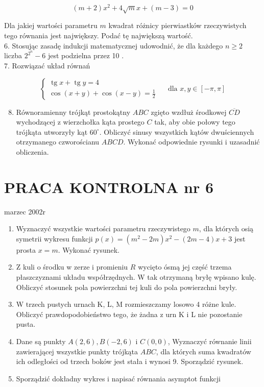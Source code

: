 \documentclass[10pt]{article}
\begin{document}
$$
(m+2) x^{2}+4 \sqrt{m} x+(m-3)=0
$$

Dla jakiej wartości parametru $m$ kwadrat różnicy pierwiastków rzeczywistych tego równania jest największy. Podać tę największą wartość.\\
6. Stosując zasadę indukcji matematycznej udowodnić, że dla każdego $n \geqslant 2$ liczba $2^{2^{n}}-6$ jest podzielna przez 10 .\\
7. Rozwiązać układ równań

$$
\left\{\begin{array}{l}
\operatorname{tg} x+\operatorname{tg} y=4 \\
\cos (x+y)+\cos (x-y)=\frac{1}{2}
\end{array} \quad \text { dla } x, y \in[-\pi, \pi]\right.
$$

\begin{enumerate}
  \setcounter{enumi}{7}
  \item Równoramienny trójkąt prostokątny $A B C$ zgięto wzdłuż środkowej $\overline{C D}$ wychodzącej z wierzchołka kąta prostego $C$ tak, aby obie połowy tego trójkąta utworzyły kąt $60^{\circ}$. Obliczyć sinusy wszystkich kątów dwuściennych otrzymanego czworościanu $A B C D$. Wykonać odpowiednie rysunki i uzasadnić obliczenia.
\end{enumerate}

\section*{PRACA KONTROLNA nr 6}
marzec 2002r

\begin{enumerate}
  \item Wyznaczyć wszystkie wartości parametru rzeczywistego $m$, dla których osią symetrii wykresu funkcji $p(x)=\left(m^{2}-2 m\right) x^{2}-(2 m-4) x+3$ jest prosta $x=m$. Wykonać rysunek.
  \item Z kuli o środku w zerze i promieniu $R$ wycięto ósmą jej część trzema płaszczyznami układu współrzędnych. W tak otrzymaną bryłę wpisano kulę. Obliczyć stosunek pola powierzchni tej kuli do pola powierzchni bryły.
  \item W trzech pustych urnach K, L, M rozmieszczamy losowo 4 różne kule. Obliczyć prawdopodobieństwo tego, że żadna z urn K i L nie pozostanie pusta.
  \item Dane są punkty $A(2,6), B(-2,6)$ i $C(0,0)$, Wyznaczyć równanie linii zawierającej wszystkie punkty trójkąta $A B C$, dla których suma kwadratów ich odległości od trzech boków jest stała i wynosi 9. Sporządzić rysunek.
  \item Sporządzić dokładny wykres i napisać równania asymptot funkcji
\end{enumerate}
\end{document}
